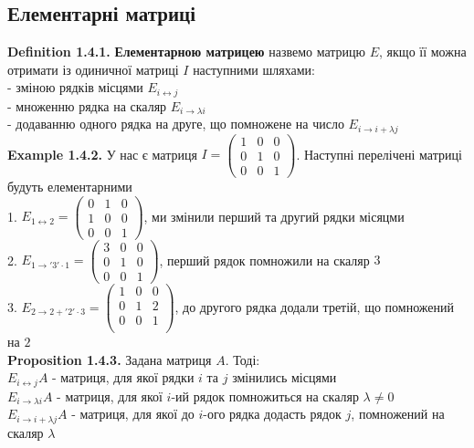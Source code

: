 \documentclass[a4paper, 14pt]{extarticle}
\def\defin#1{\textbf{Definition {#1}}}
\def\ex#1{\textbf{Example {#1}}}
\def\prp#1{\textbf{Proposition {#1}}}
\def\bigline{\vspace{5mm}\\}
\begin{document}
	\subsection{Елементарні матриці}
	\defin{1.4.1.} \textbf{Елементарною матрицею} назвемо матрицю $E$, якщо її можна отримати із одиничної матриці $I$ наступними шляхами:\\
	- зміною рядків місцями $E_{i \leftrightarrow j}$\\
	- множенню рядка на скаляр $E_{i \rightarrow \lambda i}$\\
	- додаванню одного рядка на друге, що помножене на число $E_{i \rightarrow i + \lambda j}$
	\bigline
	\ex{1.4.2.} У нас є матриця $I = \begin{pmatrix}
	1 & 0 & 0 \\
	0 & 1 & 0 \\
	0 & 0 & 1
	\end{pmatrix}$. Наступні перелічені матриці будуть елементарними\\
	1. $E_{1 \leftrightarrow 2} = \begin{pmatrix}
	0 & 1 & 0 \\
	1 & 0 & 0 \\
	0 & 0 & 1 
	\end{pmatrix}$, ми змінили перший та другий рядки місяцми\\
	2. $E_{1 \rightarrow '3' \cdot 1} = \begin{pmatrix}
	3 & 0 & 0 \\
	0 & 1 & 0 \\
	0 & 0 & 1
	\end{pmatrix}$, перший рядок помножили на скаляр $3$\\
	3. $E_{2 \rightarrow 2 + '2'\cdot 3} = \begin{pmatrix}
	1 & 0 & 0 \\
	0 & 1 & 2 \\
	0 & 0 & 1 \\
	\end{pmatrix}$, до другого рядка додали третій, що помножений на $2$
	\bigline
	\prp{1.4.3.} Задана матриця $A$. Тоді:\\
	$E_{i \leftrightarrow j}A$ - матриця, для якої рядки $i$ та $j$ змінились місцями\\
	$E_{i \rightarrow \lambda i}A$ - матриця, для якої $i$-ий рядок помножиться на скаляр $\lambda \neq 0$\\
	$E_{i \rightarrow i + \lambda j}A$ - матриця, для якої до $i$-ого рядка додасть рядок $j$, помножений на скаляр $\lambda$\\
\end{document}
